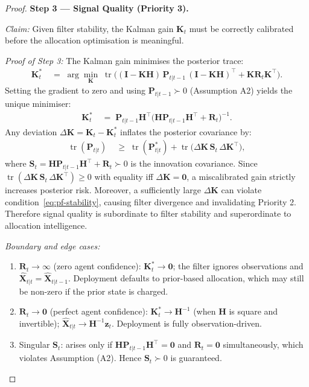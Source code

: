 \documentclass[12pt,openany]{book}
\numberwithin{equation}{chapter}
\theoremstyle{plain}
\theoremstyle{definition}
\theoremstyle{remark}
\DeclareMathOperator{\tr}{tr}
\begin{document}
\begin{proof}
\medskip
\noindent\textbf{Step 3 — Signal Quality (Priority 3).}

\noindent\textit{Claim:} Given filter stability, the Kalman
gain $\mathbf{K}_t$ must be correctly calibrated before the
allocation optimisation is meaningful.

\noindent\textit{Proof of Step 3:}
The Kalman gain minimises the posterior trace:
\begin{align}
  \mathbf{K}_t^*
  &\;=\; \arg\min_{\mathbf{K}} \;
        \tr\!\bigl((\mathbf{I}-\mathbf{K}\mathbf{H})\,
        \mathbf{P}_{t|t-1}\,
        (\mathbf{I}-\mathbf{K}\mathbf{H})^\top
        + \mathbf{K}\mathbf{R}_t\mathbf{K}^\top\bigr).
  \label{eq:pf-gain-opt}
\end{align}
Setting the gradient to zero and using $\mathbf{P}_{t|t-1}\succ0$
(Assumption A2) yields the unique minimiser:
\begin{align}
  \mathbf{K}_t^*
  &\;=\; \mathbf{P}_{t|t-1}\mathbf{H}^\top
        \!\bigl(\mathbf{H}\mathbf{P}_{t|t-1}\mathbf{H}^\top
        + \mathbf{R}_t\bigr)^{-1}.
  \label{eq:pf-kalman-gain}
\end{align}
Any deviation $\Delta\mathbf{K} = \mathbf{K}_t - \mathbf{K}_t^*$
inflates the posterior covariance by:
\begin{align}
  \tr(\mathbf{P}_{t|t})
  &\;\geq\; \tr(\mathbf{P}_{t|t}^*) + \tr\!\bigl(
        \Delta\mathbf{K}\,\mathbf{S}_t\,\Delta\mathbf{K}^\top
        \bigr),
  \label{eq:pf-gain-inflation}
\end{align}
where $\mathbf{S}_t = \mathbf{H}\mathbf{P}_{t|t-1}\mathbf{H}^\top
+ \mathbf{R}_t \succ 0$ is the innovation covariance.  Since
$\tr(\Delta\mathbf{K}\,\mathbf{S}_t\,\Delta\mathbf{K}^\top) \geq 0$
with equality iff $\Delta\mathbf{K}=\mathbf{0}$, a
miscalibrated gain strictly increases posterior risk.  Moreover,
a sufficiently large $\Delta\mathbf{K}$ can violate
condition~\eqref{eq:pf-stability}, causing filter divergence
and invalidating Priority 2.  Therefore signal quality is
subordinate to filter stability and superordinate to allocation
intelligence.

\noindent\textit{Boundary and edge cases:}
\begin{enumerate}
  \item $\mathbf{R}_t \to \infty$ (zero agent confidence):
        $\mathbf{K}_t^* \to \mathbf{0}$; the filter ignores
        observations and $\hat{\mathbf{X}}_{t|t} =
        \hat{\mathbf{X}}_{t|t-1}$.  Deployment defaults to
        prior-based allocation, which may still be non-zero if
        the prior state is charged.
  \item $\mathbf{R}_t \to \mathbf{0}$ (perfect agent confidence):
        $\mathbf{K}_t^* \to \mathbf{H}^{-1}$ (when
        $\mathbf{H}$ is square and invertible);
        $\hat{\mathbf{X}}_{t|t} \to \mathbf{H}^{-1}\mathbf{z}_t$.
        Deployment is fully observation-driven.
  \item Singular $\mathbf{S}_t$: arises only if
        $\mathbf{H}\mathbf{P}_{t|t-1}\mathbf{H}^\top = \mathbf{0}$
        and $\mathbf{R}_t = \mathbf{0}$ simultaneously, which
        violates Assumption (A2).  Hence $\mathbf{S}_t \succ 0$
        is guaranteed.
\end{enumerate}


\end{proof}
\end{document}
